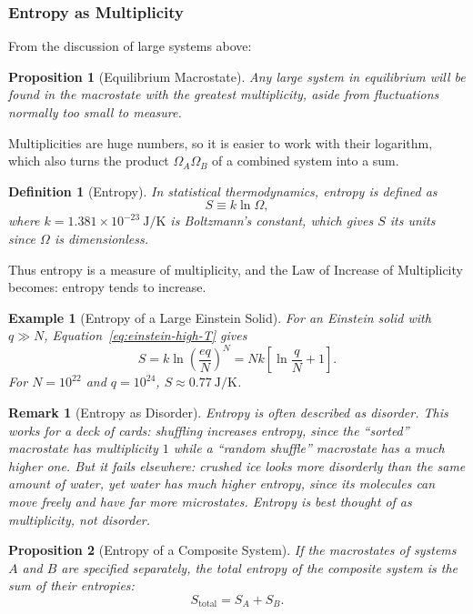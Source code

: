 \documentclass{article}
\newtheorem{definition}{Definition}
\newtheorem{example}{Example}
\newtheorem{remark}{Remark}
\newtheorem{proposition}{Proposition}
\begin{document}
\subsubsection{Entropy as Multiplicity}
From the discussion of large systems above:
\begin{proposition}[Equilibrium Macrostate]
    Any large system in equilibrium will be found in the macrostate with the greatest multiplicity, aside from fluctuations normally too small to measure.
\end{proposition}
Multiplicities are huge numbers, so it is easier to work with their logarithm, which also turns the product $\Omega_A\Omega_B$ of a combined system into a sum.
\begin{definition}[Entropy]
    In statistical thermodynamics, entropy is defined as
    \begin{equation}
        \label{eq:boltzmann-entropy}
        S \equiv k\ln\Omega,
    \end{equation}
    where $k = 1.381 \times 10^{-23}~\text{J/K}$ is Boltzmann's constant, which gives $S$ its units since $\Omega$ is dimensionless.
\end{definition}
Thus entropy is a measure of multiplicity, and the Law of Increase of Multiplicity becomes: entropy tends to increase.
\begin{example}[Entropy of a Large Einstein Solid]
    For an Einstein solid with $q \gg N$, Equation~\eqref{eq:einstein-high-T} gives
    \[S = k\ln\left(\frac{eq}{N}\right)^N = Nk\left[\ln\frac{q}{N} + 1\right].\]
    For $N = 10^{22}$ and $q = 10^{24}$, $S \approx 0.77~\text{J/K}$.
\end{example}
\begin{remark}[Entropy as Disorder]
    Entropy is often described as disorder. This works for a deck of cards: shuffling increases entropy, since the ``sorted'' macrostate has multiplicity $1$ while a ``random shuffle'' macrostate has a much higher one. But it fails elsewhere: crushed ice looks more disorderly than the same amount of water, yet water has much higher entropy, since its molecules can move freely and have far more microstates. Entropy is best thought of as multiplicity, not disorder.
\end{remark}
\begin{proposition}[Entropy of a Composite System]
    If the macrostates of systems $A$ and $B$ are specified separately, the total entropy of the composite system is the sum of their entropies:
    \begin{equation}
        \label{eq:entropy-additive}
        S_{\text{total}} = S_A + S_B.
    \end{equation}
\end{proposition}
\end{document}
